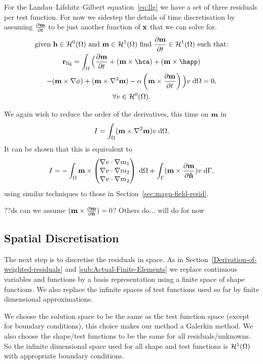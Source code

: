 For the Landau--Lifshitz--Gilbert equation~\eqref{eq:llg} we have a set of three residuals per test function. For now we sidestep the details of time discretisation by assuming $\frac{\partial \mathbf{m}}{\partial t}$ to be just another function of $\mathbf{x}$ that we can solve for.
\begin{gather}
  \text{given $\hv \in \sob^0(\magd)$ and $\mv \in \sob^1(\magd)$ find $\dmdt \in \sob^1(\magd)$ such that:} \notag
  \\
  \mathbf{r}_{\text{llg}} = \int_\magd \Big( \dmdt
  + (\mv \times \hca) + (\mv \times \happ) \\
  - (\mv \times \nabla \phi) + (\mv \times \nabla^2 \mv)
  - \dampc \left( \mv \times \dmdt \right)
  \Big)  v \d\magd
  = 0, \label{res:contllg}
  \\
  \forall v \in \sob^0(\magd). \notag
\end{gather}

We again wish to reduce the order of the derivatives, this time on $\mathbf{m}$ in
\begin{equation}
 I = \int_\Omega (\mathbf{m} \times \nabla^2 \mathbf{m}) v {\; \text{d}}\Omega.
 \label{eq:46}
\end{equation}
It can be shown that this is equivalent to
\begin{equation}
  \label{eq:49}
  I = - \int_\Omega  \mathbf{m} \times \begin{pmatrix} \nabla v \cdot \nabla m_1 \\ \nabla v \cdot \nabla m_2 \\ \nabla v \cdot \nabla m_2 \end{pmatrix} {\; \text{d}}\Omega + \int_{\Gamma} (\mathbf{m} \times \frac{\partial \mathbf{m}}{\partial \mathbf{\hat{n}}}) v {\; \text{d}}{\Gamma},
\end{equation}
using similar techniques to those in Section~\ref{sec:magn-field-resid}. %

??ds can we assume $(\mathbf{m} \times \frac{\partial \mathbf{m}}{\partial \mathbf{\hat{n}}}) = 0$? Others do... will do for now

\subsection{Spatial Discretisation}
\label{sec:spat-discr-resi}

The next step is to discretise the residuals in space. As in Section~\ref{Derivation-of-weighted-residuals} and \ref{sub:Actual-Finite-Elements} we replace continuous variables and functions by a basis representation using a finite space of shape functions. We also replace the infinite spaces of test functions used so far by finite dimensional approximations.

We choose the solution space to be the same as the test function space (except for boundary conditions), this choice makes our method a Galerkin method. We also choose the shape/test functions to be the same for all residuals/unknowns. So the infinite dimensional space used for all shape and test functions is $\mathcal{H}^1(\Omega)$ with appropriate boundary conditions.

